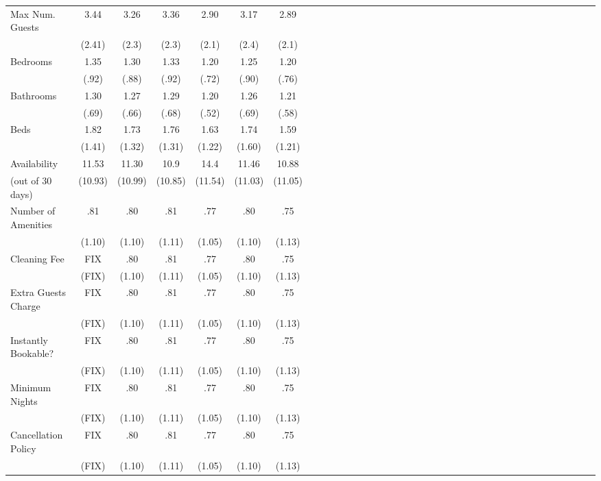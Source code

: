 {\begin{longtable}{l*{6}{c|c|cccc}}
Max Num. Guests   & 3.44   &      3.26	&      3.36  &      2.90		&    3.17 		&	 2.89\\
               & (2.41)    &     (2.3)         &     (2.3)         &     (2.1)         &     (2.4)         & (2.1)\\
Bedrooms    &  1.35 &      1.30 &      1.33         &      1.20         &      1.25   & 1.20      \\
              &   (.92)   &     (.88)         &     (.92)         &     (.72)         &     (.90)       & (.76)  \\
Bathrooms  & 1.30  &      1.27         &       1.29         &      1.20         &      1.26 & 1.21         \\
                &  (.69)  &     (.66)         &     (.68)         &     (.52)         &     (.69)         & (.58)\\
Beds       & 1.82  &      1.73 &      1.76         &      1.63         &      1.74         & 1.59\\
               &   (1.41)  &     (1.32)         &     (1.31)         &     (1.22)         &     (1.60)   & (1.21)      \\
Availability    & 11.53   &      11.30&      10.9&      14.4 &      11.46  	& 	10.88\\
(out of 30 days)         &  (10.93)    & (10.99)     &     (10.85)         &     (11.54)         &     (11.03)         &     (11.05)         \\
Number of Amenities   &   .81  &      .80		&      .81&      .77 &      .80  	& 	.75\\
           &  (1.10)  & (1.10)     &     (1.11)         &     (1.05)         &     (1.10)         &     (1.13)         \\
Cleaning Fee   &  FIX &      .80		&      .81&      .77 &      .80  	& 	.75\\
&  (FIX)  & (1.10)     &     (1.11)         &     (1.05)         &     (1.10)         &     (1.13)         \\
Extra Guests Charge   &   FIX  &      .80		&      .81&      .77 &      .80  	& 	.75\\
&  (FIX)  & (1.10)     &     (1.11)         &     (1.05)         &     (1.10)         &     (1.13)         \\
Instantly Bookable?   &   FIX  &      .80		&      .81&      .77 &      .80  	& 	.75\\
&  (FIX)  & (1.10)     &     (1.11)         &     (1.05)         &     (1.10)         &     (1.13)         \\
Minimum Nights   &   FIX  &      .80		&      .81&      .77 &      .80  	& 	.75\\
&  (FIX)  & (1.10)     &     (1.11)         &     (1.05)         &     (1.10)         &     (1.13)         \\
Cancellation Policy   &   FIX  &      .80		&      .81&      .77 &      .80  	& 	.75\\
&  (FIX)  & (1.10)     &     (1.11)         &     (1.05)         &     (1.10)         &     (1.13)         \\


\end{longtable}}
